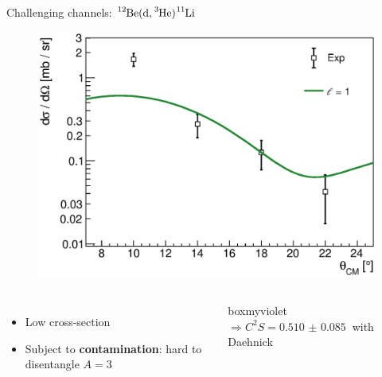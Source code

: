 \documentclass[sans,
frameno, %
mp,
usenames,dvipsnames, %
onlytextwidth, %
t,%
11pt]{beamer}
\newcommand{\iso}[2]{\ce{^{#1}#2}}
\begin{document}
\begin{frame}{Challenging channels: $\iso{12}{Be}(\textrm{d}, \iso{3}{He})\iso{11}{Li}$}
\begin{figure}
\begin{minipage}[t]{0.48\linewidth}
            \includegraphics[width=\textwidth]{figures/Workshop/12Be_d3He_xs.eps}
        \end{minipage}
    \end{figure}
    \bigskip
    \begin{columns}[c]
        {
            \begin{itemize}
                \item Low cross-section
                \item Subject to \textbf{contamination}: hard to disentangle $A = 3$
            \end{itemize}
        }\hfill
        {
            \begin{beamercolorbox}[sep=1ex, center, rounded=true]{boxmyviolet}
                $\Rightarrow C^2S = \qty{0.510(85)}{}$ with Daehnick
            \end{beamercolorbox}
        }
    \end{columns}
\end{frame}
\end{document}
